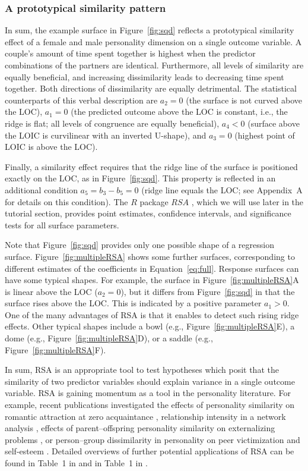 \documentclass[jou,a4paper,draftfirst]{apa6}
\begin{document}
\subsubsection{A prototypical similarity pattern}
In sum, the example surface in Figure~\ref{fig:sqd} reflects a prototypical similarity effect of a female and male personality dimension on a single outcome variable. A couple’s amount of time spent together is highest when the predictor combinations of the partners are identical. Furthermore, all levels of similarity are equally beneficial, and increasing dissimilarity leads to decreasing time spent together. Both directions of dissimilarity are equally detrimental. The statistical counterparts of this verbal description are $a_2 = 0$ (the surface is not curved above the LOC), $a_1 = 0$ (the predicted outcome above the LOC is constant, i.e., the ridge is flat; all levels of congruence are equally beneficial), $a_4 < 0$ (surface above the LOIC is curvilinear with an inverted U-shape), and $a_3 = 0$ (highest point of LOIC is above the LOC). 

Finally, a similarity effect requires that the ridge line of the surface is positioned exactly on the LOC, as in Figure~\ref{fig:sqd}. This property is reflected in an additional condition $a_5 = b_3 - b_5 = 0$ (ridge line equals the LOC; see Appendix~A for details on this condition). The $R$ package $RSA$ \parencite{schonbrodt_rsa:_2016}, which we will use later in the tutorial section, provides point estimates, confidence intervals, and significance tests for all surface parameters.

Note that Figure~\ref{fig:sqd} provides only one possible shape of a regression surface. Figure~\ref{fig:multipleRSA} shows some further surfaces, corresponding to different estimates of the coefficients in Equation~\ref{eq:full}. Response surfaces can have some typical shapes. For example, the surface in Figure~\ref{fig:multipleRSA}A is linear above the LOC ($a_2=0$), but it differs from Figure~\ref{fig:sqd} in that the surface rises above the LOC. This is indicated by a positive parameter $a_1 > 0$. One of the many advantages of RSA is that it enables to detect such rising ridge effects.
Other typical shapes include a bowl (e.g., Figure~\ref{fig:multipleRSA}E), a dome (e.g., Figure~\ref{fig:multipleRSA}D), or a saddle (e.g., Figure~\ref{fig:multipleRSA}F).

In sum, RSA is an appropriate tool to test hypotheses which posit that the similarity of two predictor variables should explain variance in a single outcome variable.
RSA is gaining momentum as a tool in the personality literature. For example, recent publications investigated the effects of personality similarity on romantic attraction at zero acquaintance \parencite{olderbak_predicting_2017}, relationship intensity in a network analysis \parencite{ilmarinen_homophilous_2017}, effects of parent–offspring personality similarity on externalizing problems \parencite{franken_using_2017}, or person–group dissimilarity in personality on peer victimization \parencite{boele_persongroup_2017} and self-esteem \parencite{Bleidorn_2016}. Detailed overviews of further potential applications of RSA can be found in Table~1 in \textcite{Barranti__2017} and in Table~1 in \textcite{HumbergRSA}.
\end{document}

